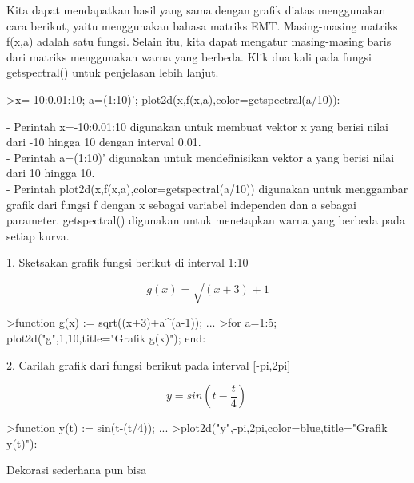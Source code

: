 \documentclass[a4paper,10pt]{article}
\begin{document}
\begin{eulernotebook}
\begin{eulercomment}
\begin{eulercomment}
\begin{eulercomment}
\begin{eulercomment}
\begin{eulercomment}
\begin{eulercomment}
\begin{eulercomment}
Kita dapat mendapatkan hasil yang sama dengan grafik diatas
menggunakan cara berikut, yaitu menggunakan bahasa matriks EMT.
Masing-masing matriks f(x,a) adalah satu fungsi. Selain itu, kita
dapat mengatur masing-masing baris dari matriks menggunakan warna yang
berbeda. Klik dua kali pada fungsi getspectral() untuk penjelasan
lebih lanjut.
\end{eulercomment}
\begin{eulerprompt}
>x=-10:0.01:10; a=(1:10)'; plot2d(x,f(x,a),color=getspectral(a/10)):
\end{eulerprompt}
\begin{eulercomment}
- Perintah x=-10:0.01:10 digunakan untuk membuat vektor x yang berisi
nilai dari -10 hingga 10 dengan interval 0.01.\\
- Perintah a=(1:10)' digunakan untuk mendefinisikan vektor a yang
berisi nilai dari 10 hingga 10.\\
- Perintah plot2d(x,f(x,a),color=getspectral(a/10)) digunakan untuk
menggambar grafik dari fungsi f dengan x sebagai variabel independen
dan a sebagai parameter. getspectral() digunakan untuk menetapkan
warna yang berbeda pada setiap kurva.

\end{eulercomment}
\begin{eulercomment}
1. Sketsakan grafik fungsi berikut di interval 1:10\\
\end{eulercomment}
\begin{eulerformula}
\[
g(x) = \sqrt{(x+3)}+1
\]
\end{eulerformula}
\begin{eulerprompt}
>function g(x) := sqrt((x+3)+a^(a-1)); ...
>for a=1:5; plot2d("g",1,10,title="Grafik g(x)"); end:
\end{eulerprompt}
\begin{eulercomment}
2. Carilah grafik dari fungsi berikut pada interval [-pi,2pi]\\
\end{eulercomment}
\begin{eulerformula}
\[
y = sin \left (t-\frac{t}{4}\right) \
\]
\end{eulerformula}
\begin{eulerprompt}
>function y(t) := sin(t-(t/4)); ...
>plot2d("y",-pi,2pi,color=blue,title="Grafik y(t)"):
\end{eulerprompt}
\eulersubheading{Label Teks}
\begin{eulercomment}
Dekorasi sederhana pun bisa


\end{eulercomment}
\end{eulercomment}
\end{eulercomment}
\end{eulercomment}
\end{eulercomment}
\end{eulercomment}
\end{eulercomment}
\end{eulernotebook}
\end{document}
